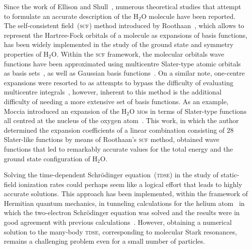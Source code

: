 Since the work of Ellison and Shull~\cite{EllisonShullh2o_1955},
numerous theoretical studies that attempt to formulate an accurate
description of the H$_{2}$O molecule have been reported. The
self-consistent field~(\textsc{scf}) method introduced by
Roothaan~\cite{Roothaan_1951}, which allows to represent the
Hartree-Fock orbitals of a molecule as expansions of basis functions,
has been widely implemented in the study of the ground state and
symmetry properties of H$_{2}$O. Within the \textsc{scf} framework,
the molecular orbitals wave functions have been approximated using
multicentre Slater-type atomic orbitals as basis
sets~\cite{Reeves_nature_1956,natureH2O_1960,Pitzer_1968,Pitzer_1970},
as well as Gaussian basis
functions~\cite{gaussianH2O_1965,Neumann_gaussian_1968}. On a similar
note, one-centre expansions were resorted to as attempts to bypass the
difficulty of evaluating multicentre
integrals~\cite{Moccia_1964,oneCentre_1961,Parr_JCP_1960}, however,
inherent to this method is the additional difficulty of needing a more
extensive set of basis functions. As an example, Moccia introduced an
expansion of the H$_{2}$O \textsc{mo}s in terms of Slater-type
functions all centred at the nucleus of the oxygen
atom~\cite{Moccia_1964}. This work, in which the author determined the
expansion coefficients of a linear combination consisting of $28$
Slater-like functions by means of Roothaan's \textsc{scf} method,
obtained wave functions that led to remarkably accurate values for the
total energy and the ground state configuration of H$_{2}$O.


Solving the time-dependent Schr\"{o}dinger equation~(\textsc{tdse}) in
the study of static-field ionization rates could perhaps seem like a
logical effort that leads to highly accurate solutions. This approach
has been implemented, within the framework of Hermitian quantum
mechanics, in tunneling calculations for the helium
atom~\cite{static_tdse_He,static_tdse_He_method} in which the
two-electron Schr\"{o}dinger equation was solved and the results were
in good agreement with previous
calculations~\cite{static_He_scrinzi}. However, obtaining a numerical
solution to the many-body \textsc{tdse}, corresponding to molecular
Stark resonances, remains a challenging problem even for a small
number of particles.


